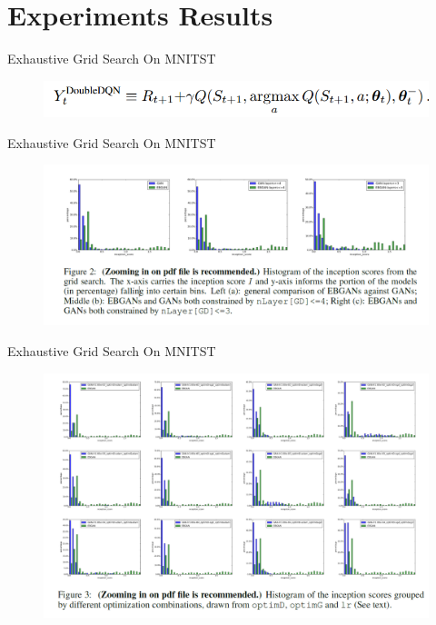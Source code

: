 \documentclass[mathserif]{beamer}
\begin{document}
\section{Experiments Results}
\begin{frame}{Exhaustive Grid Search On MNITST}
\begin{figure}
  \centering
  \includegraphics[scale=0.5]{fig/2.png}
  \label{}
\end{figure}
\end{frame}
\begin{frame}{Exhaustive Grid Search On MNITST}
\begin{figure}
  \centering
  \includegraphics[scale=0.5]{fig/3.png}
  \label{}
\end{figure}
\end{frame}
\begin{frame}{Exhaustive Grid Search On MNITST}
\begin{figure}
  \centering
  \includegraphics[scale=0.5]{fig/4.png}
  \label{}
\end{figure}
\end{frame}
\end{document}
